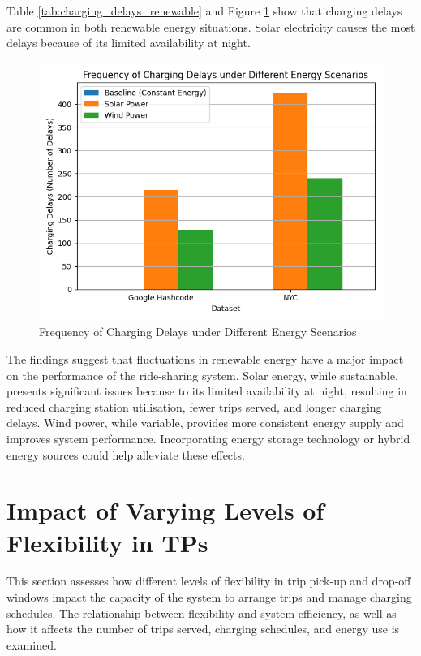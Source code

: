 Table \ref{tab:charging_delays_renewable} and Figure \ref{fig:charging_delays_renewable} show that charging delays are common in both renewable energy situations. Solar electricity causes the most delays because of its limited availability at night.

\begin{figure}[htbp]
\centering
\includegraphics[scale=0.55]{Crest/Images/charging_delays_renewable.png}
\caption{Frequency of Charging Delays under Different Energy Scenarios}
\label{fig:charging_delays_renewable}
\end{figure}

The findings suggest that fluctuations in renewable energy have a major impact on the performance of the ride-sharing system. Solar energy, while sustainable, presents significant issues because to its limited availability at night, resulting in reduced charging station utilisation, fewer trips served, and longer charging delays. Wind power, while variable, provides more consistent energy supply and improves system performance. Incorporating energy storage technology or hybrid energy sources could help alleviate these effects.

\section{Impact of Varying Levels of Flexibility in TPs}
\label{sec:flexibility_trip_requests}

This section assesses how different levels of flexibility in trip pick-up and drop-off windows impact the capacity of the system to arrange trips and manage charging schedules. The relationship between flexibility and system efficiency, as well as how it affects the number of trips served, charging schedules, and energy use is examined.

